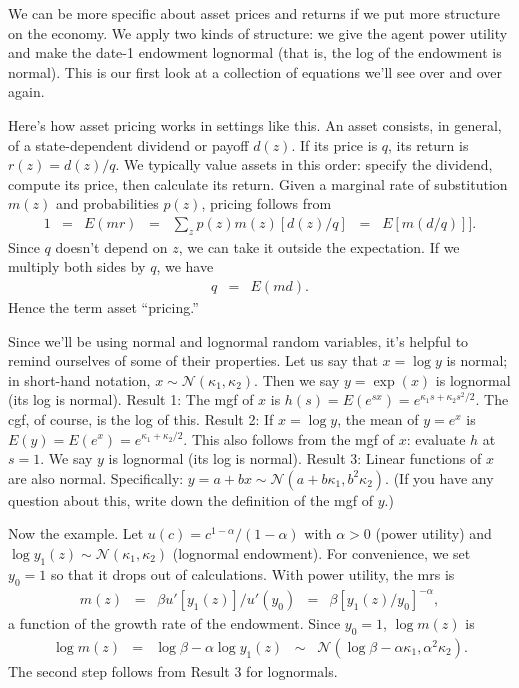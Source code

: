 \documentclass[11pt]{article}
\begin{document}
We can be more specific about asset prices and returns
if we put more structure on the economy.
We apply two kinds of structure:  we give the agent power utility
and make the date-1 endowment lognormal (that is, the log of the
endowment is normal).
This is our first look at a collection of equations we'll
see over and over again.

Here's how asset pricing works in settings like this.
An asset consists, in general,
of a state-dependent dividend or payoff $d(z)$.
If its price is $q$, its return is $ r(z) = d(z)/q$.
We typically value assets in this order:
specify the dividend, compute its price, then calculate its return.
Given a marginal rate of substitution $m(z)$ and probabilities $p(z)$,
pricing follows from
\begin{eqnarray*}
    1 &=& E (mr) \;\;=\;\; \sum_z p(z) m(z) [d(z)/q] \;\;=\;\;  E [m (d/q)]] .
\end{eqnarray*}
Since $q$ doesn't depend on $z$, we can take it outside the expectation.
If we multiply both sides by $q$, we have
\begin{eqnarray*}
    q &=& E (md)  .
\end{eqnarray*}
Hence the term asset ``pricing.''

Since we'll be using normal and lognormal random variables,
it's helpful to remind ourselves of some of their properties.
Let us say that $x = \log y$ is normal;
in short-hand notation, $ x \sim \mathcal{N}(\kappa_1,\kappa_2)$.
Then we say $y = \exp(x) $ is lognormal (its log is normal).
Result 1:  The mgf of $x$ is
$h(s) = E(e^{sx}) = e^{\kappa_1 s +\kappa_2 s^2/2}$.
The cgf, of course, is the log of this.  
Result 2:  If $x = \log y$, the mean of
$y = e^x$ is $E(y) = E(e^x) = e^{\kappa_1 + \kappa_2/2}$.
This also follows from the mgf of $x$:  evaluate $h$ at $s=1$.
We say $ y$ is lognormal (its log is normal).
Result 3:  Linear functions of $x$ are also normal.
Specifically:  $ y = a + b x \sim \mathcal{N}(a + b \kappa_1, b^2 \kappa_2)$.
(If you have any question about this, write down the definition of the mgf of $y$.)


Now the example.
Let $u(c) = c^{1-\alpha}/(1-\alpha)$ with $\alpha>0$ (power utility)
and
$\log y_1(z) \sim \mathcal{N}(\kappa_1,\kappa_2)$
(lognormal endowment).
For convenience, we set $y_0 = 1$ so that it drops out of
calculations.
With power utility, the mrs is
\begin{eqnarray*}
        m(z) \;\;=\;\; {\beta u'[y_1(z)]}/{u'(y_0)} &=&  \beta [y_1(z)/y_0]^{-\alpha} ,
\end{eqnarray*}
a function of the growth rate of the endowment.
Since $y_0 = 1$, $\log m(z)$ is
\begin{eqnarray*}
    \log m(z) &=& \log \beta - \alpha \log y_1(z)
        \;\;\sim\;\; \mathcal{N}(\log \beta - \alpha \kappa_1, \alpha^2 \kappa_2).
\end{eqnarray*}
The second step follows from Result 3 for lognormals.
\end{document}
